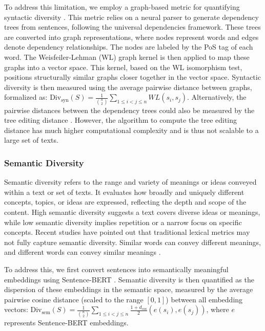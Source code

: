 \documentclass[11pt,a4paper]{article}
\begin{document}
To address this limitation, we employ a graph-based metric for quantifying syntactic diversity \citep{guo-etal-2024-curious}. This metric relies on a neural parser \citep{qi-etal-2020-stanza} to generate dependency trees from sentences, following the universal dependencies framework. These trees are converted into graph representations, where nodes represent words and edges denote dependency relationships. The nodes are labeled by the PoS tag of each word. The Weisfeiler-Lehman (WL) graph kernel \citep{10.5555/1953048.2078187, JMLR:v21:18-370} is then applied to map these graphs into a vector space. This kernel, based on the WL isomorphism test, positions structurally similar graphs closer together in the vector space. Syntactic diversity is then measured using the average pairwise distance between graphs, formalized as: $\text{Div}_{\text{syn}}(S) = \frac{1}{\binom{n}{2}} \sum_{1 \leq i < j \leq n}WL(s_i, s_j)$. Alternatively, the pairwise distances between the dependency trees could also be measured by the tree editing distance \citep{zhang1989simple}. However, the algorithm to compute the tree editing distance has much higher computational complexity and is thus not scalable to a large set of texts.






\subsubsection{Semantic Diversity}
Semantic diversity refers to the range and variety of meanings or ideas conveyed within a text or set of texts. It evaluates how broadly and uniquely different concepts, topics, or ideas are expressed, reflecting the depth and scope of the content. High semantic diversity suggests a text covers diverse ideas or meanings, while low semantic diversity implies repetition or a narrow focus on specific concepts.
Recent studies \citep{tevet-berant-2021-evaluating, stasaski-hearst-2022-semantic} have pointed out that traditional lexical metrics may not fully capture semantic diversity. Similar words can convey different meanings, and different words can convey similar meanings \citep{pmlr-v80-yarats18a}. 

To address this, we first convert sentences into semantically meaningful embeddings using Sentence-BERT \cite{reimers-gurevych-2019-sentence}. Semantic diversity is then quantified as the dispersion of these embeddings in the semantic space, measured by the average pairwise cosine distance (scaled to the range $[0,1]$) between all embedding vectors: $\text{Div}_{\text{sem}}(S) = \frac{1}{\binom{n}{2}} \sum_{1 \leq i < j \leq n}  \frac{1 + d_{\text{cos}}}{2}(e(s_i), e(s_j))$, where $e$ represents Sentence-BERT embeddings.
\end{document}
